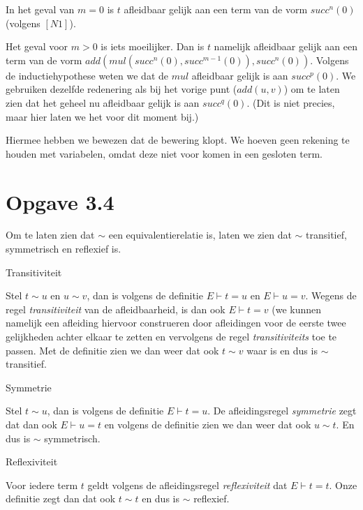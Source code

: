 \documentclass[a4paper,11pt]{article}
\begin{document}
\begin{description}
\begin{description}
    In het geval van $m=0$ is $t$ afleidbaar gelijk aan een term van de vorm
    $succ^{n}(0)$ (volgens $[N1]$).

    Het geval voor $m>0$ is iets moeilijker. Dan is $t$ namelijk afleidbaar
    gelijk aan een term van de vorm $add(mul(succ^{n}(0), succ^{m-1}(0)),                                                    
    succ^{n}(0))$. Volgens de inductiehypothese weten we dat de $mul$
    afleidbaar gelijk is aan $succ^{p}(0)$. We gebruiken dezelfde redenering
    als bij het vorige punt ($add(u, v)$) om te laten zien dat het geheel nu
    afleidbaar gelijk is aan $succ^{q}(0)$. (Dit is niet precies, maar hier
    laten we het voor dit moment bij.)

  \end{description}

\end{description}

Hiermee hebben we bewezen dat de bewering klopt. We hoeven geen rekening te
houden met variabelen, omdat deze niet voor komen in een gesloten term.


\section*{Opgave 3.4}

Om te laten zien dat $\sim$ een equivalentierelatie is, laten we zien dat $\sim$
transitief, symmetrisch en reflexief is.

\begin{description}

\item{Transitiviteit}

  Stel $t \sim u$ en $u \sim v$, dan is volgens de definitie $E \vdash t = u$ en
  $E \vdash u = v$. Wegens de regel \emph{transitiviteit} van de
  afleidbaarheid, is dan ook $E \vdash t = v$ (we kunnen namelijk een afleiding
  hiervoor construeren door afleidingen voor de eerste twee gelijkheden achter
  elkaar te zetten en vervolgens de regel \emph{transitiviteits} toe te passen.
  Met de definitie zien we dan weer dat ook $t \sim v$ waar is en dus is $\sim$
  transitief.

\item{Symmetrie}

  Stel $t \sim u$, dan is volgens de definitie $E \vdash t = u$. De
  afleidingsregel \emph{symmetrie} zegt dat dan ook $E \vdash u = t$ en
  volgens de definitie zien we dan weer dat ook $u \sim t$. En dus is $\sim$
  symmetrisch.

\item{Reflexiviteit}

  Voor iedere term $t$ geldt volgens de afleidingsregel \emph{reflexiviteit}
  dat $E \vdash t = t$. Onze definitie zegt dan dat ook $t \sim t$ en dus is
  $\sim$ reflexief.

\end{description}
\end{document}
